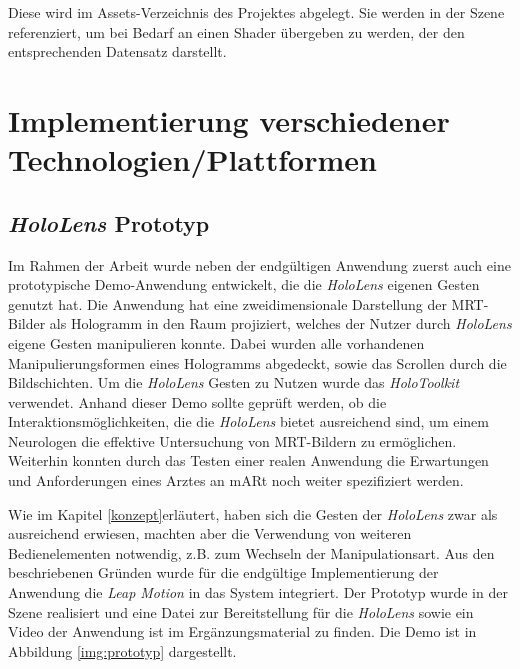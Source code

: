 Diese wird im Assets-Verzeichnis des Projektes abgelegt. Sie werden in der Szene referenziert, um bei Bedarf an einen Shader übergeben zu werden, der den entsprechenden Datensatz darstellt. 

\section{Implementierung verschiedener Technologien/Plattformen}
\label{plattformen}

\subsection{\textit{HoloLens} Prototyp}
Im Rahmen der Arbeit wurde neben der endgültigen Anwendung zuerst auch eine prototypische Demo-Anwendung entwickelt, die die \textit{HoloLens} eigenen Gesten genutzt hat. Die Anwendung hat eine zweidimensionale Darstellung der MRT-Bilder als Hologramm in den Raum projiziert, welches der Nutzer durch \textit{HoloLens} eigene Gesten manipulieren konnte. Dabei wurden alle vorhandenen Manipulierungsformen eines Hologramms abgedeckt, sowie das Scrollen durch die Bildschichten. Um die \textit{HoloLens} Gesten zu Nutzen wurde das \textit{HoloToolkit} verwendet. 
Anhand dieser Demo sollte geprüft werden, ob die Interaktionsmöglichkeiten, die die \textit{HoloLens} bietet ausreichend sind, um einem Neurologen die effektive Untersuchung von MRT-Bildern zu ermöglichen.
Weiterhin konnten durch das Testen einer realen Anwendung die Erwartungen und Anforderungen eines Arztes an mARt noch weiter spezifiziert werden.  

Wie im Kapitel \ref{konzept}erläutert, haben sich die Gesten der \textit{HoloLens} zwar als ausreichend erwiesen, machten aber die Verwendung von weiteren Bedienelementen notwendig, z.B. zum Wechseln der Manipulationsart. Aus den beschriebenen Gründen wurde für die endgültige Implementierung der Anwendung die \textit{Leap Motion} in das System integriert.
Der Prototyp wurde in der Szene  realisiert und eine Datei zur Bereitstellung für die \textit{HoloLens} sowie ein Video der Anwendung ist im Ergänzungsmaterial zu finden.
Die Demo ist in Abbildung \ref{img:prototyp} dargestellt.


